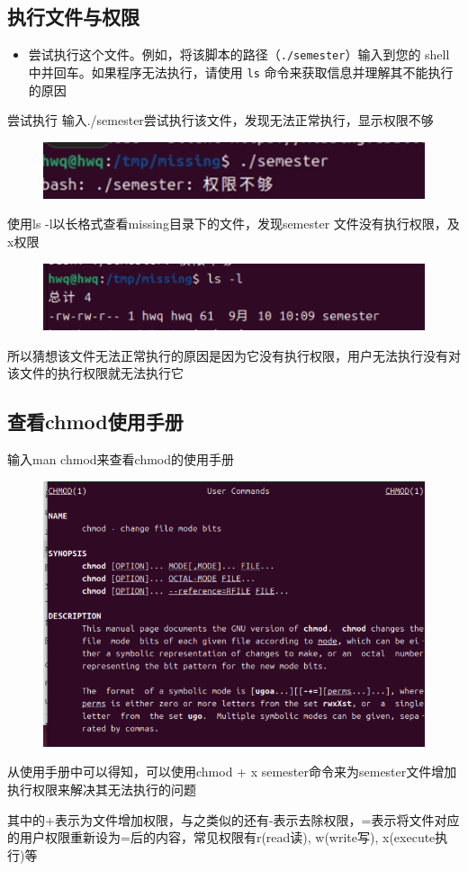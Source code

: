 \documentclass[a4paper, 12pt]{article}
\begin{document}
\subsection{执行文件与权限}
\begin{itemize}
    \item 尝试执行这个文件。例如，将该脚本的路径（\verb|./semester|）输入到您的 shell 中并回车。如果程序无法执行，请使用 \verb|ls| 命令来获取信息并理解其不能执行的原因
\end{itemize}\par
尝试执行
输入./semester尝试执行该文件，发现无法正常执行，显示权限不够
\begin{figure}[H]
    \centering
    \includegraphics[width=1\linewidth]{shell4.png}
\end{figure}
使用ls -l以长格式查看missing目录下的文件，发现semester 文件没有执行权限，及x权限
\begin{figure}[H]
    \centering
    \includegraphics[width=1\linewidth]{shell5.png}
\end{figure}
所以猜想该文件无法正常执行的原因是因为它没有执行权限，用户无法执行没有对该文件的执行权限就无法执行它
\subsection{查看chmod使用手册}
输入man chmod来查看chmod的使用手册
\begin{figure}[H]
    \centering
    \includegraphics[width=1\linewidth]{shell23.png}
\end{figure}
从使用手册中可以得知，可以使用chmod + x semester命令来为semester文件增加执行权限来解决其无法执行的问题\par
其中的+表示为文件增加权限，与之类似的还有-表示去除权限，=表示将文件对应的用户权限重新设为=后的内容，常见权限有r(read读), w(write写), x(execute执行)等
\end{document}
